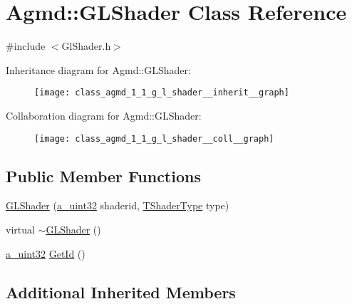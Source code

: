 \hypertarget{class_agmd_1_1_g_l_shader}{\section{Agmd\+:\+:G\+L\+Shader Class Reference}
\label{class_agmd_1_1_g_l_shader}
}


{\ttfamily \#include $<$Gl\+Shader.\+h$>$}



Inheritance diagram for Agmd\+:\+:G\+L\+Shader\+:\nopagebreak
\begin{figure}[H]
\begin{center}
\leavevmode
\texttt{[image: class\_agmd\_1\_1\_g\_l\_shader\_\_inherit\_\_graph]}
\end{center}
\end{figure}


Collaboration diagram for Agmd\+:\+:G\+L\+Shader\+:\nopagebreak
\begin{figure}[H]
\begin{center}
\leavevmode
\texttt{[image: class\_agmd\_1\_1\_g\_l\_shader\_\_coll\_\_graph]}
\end{center}
\end{figure}
\subsection*{Public Member Functions}
\begin{DoxyCompactItemize}
\item 
\hyperlink{class_agmd_1_1_g_l_shader_a40249832d8d259d55473b76db93048e6}{G\+L\+Shader} (\hyperlink{_common_defines_8h_a964296f9770051b9e4807b1f180dd416}{a\+\_\+uint32} shaderid, \hyperlink{namespace_agmd_a162a493eaff1589f07a505806e6724b4}{T\+Shader\+Type} type)
\item 
virtual \hyperlink{class_agmd_1_1_g_l_shader_afe85fecfaae88181fdc01ada1fb53fb2}{$\sim$\+G\+L\+Shader} ()
\item 
\hyperlink{_common_defines_8h_a964296f9770051b9e4807b1f180dd416}{a\+\_\+uint32} \hyperlink{class_agmd_1_1_g_l_shader_aa0408b15590d96e9a6fd3e9ce45dc6e1}{Get\+Id} ()
\end{DoxyCompactItemize}
\subsection*{Additional Inherited Members}


